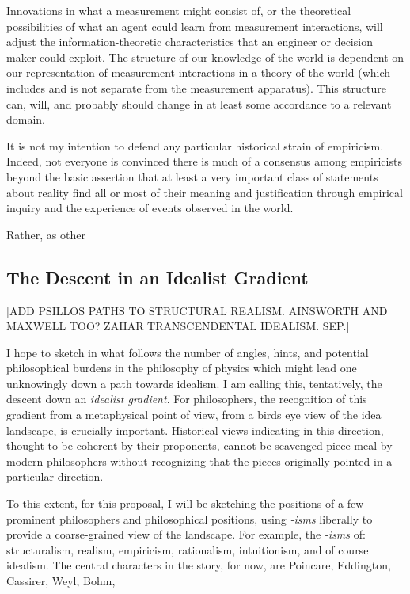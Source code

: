 Innovations in what a measurement might consist of, or the theoretical possibilities of what an agent could learn from measurement interactions, will adjust the information-theoretic characteristics that an engineer or decision maker could exploit.  The structure of our knowledge of the world is dependent on our representation of measurement interactions in a theory of the world (which includes and is not separate from the measurement apparatus).  This structure can, will, and probably should change in at least some accordance to a relevant domain.

It is not my intention to defend any particular historical strain of empiricism.  Indeed, not everyone is convinced there is much of a consensus among empiricists beyond the basic assertion that at least a very important class of statements about reality find all or most of their meaning and justification through empirical inquiry and the experience of events observed in the world.  

Rather, as other

\subsection{The Descent in an Idealist Gradient}



[ADD PSILLOS PATHS TO STRUCTURAL REALISM.  AINSWORTH AND MAXWELL TOO?  ZAHAR TRANSCENDENTAL IDEALISM. SEP.]



I hope to sketch in what follows the number of angles, hints, and potential philosophical burdens in the philosophy of physics which might lead one unknowingly down a path towards idealism.  I am calling this, tentatively, the descent down an \emph{idealist gradient}.  For philosophers, the recognition of this gradient from a metaphysical point of view, from a birds eye view of the idea landscape, is crucially important.  Historical views indicating in this direction, thought to be coherent by their proponents, cannot be scavenged piece-meal by modern philosophers without recognizing that the pieces originally pointed in a particular direction.

To this extent, for this proposal, I will be sketching the positions of a few prominent philosophers and philosophical positions, using \emph{-isms} liberally to provide a coarse-grained view of the landscape.  For example, the \emph{-isms} of: structuralism, realism, empiricism, rationalism, intuitionism, and of course idealism.  The central characters in the story, for now, are Poincare, Eddington, Cassirer, Weyl, Bohm, 

